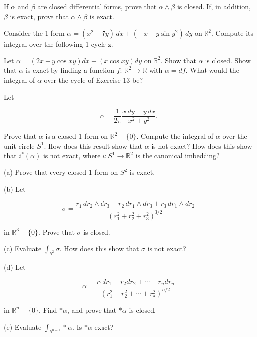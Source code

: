 \begin{problemset}
\item If  $ \alpha $ and  $ \beta $ are closed differential forms, prove that  $ \alpha \wedge \beta $ is closed. If, in addition,  $ \beta $ is exact, prove that  $ \alpha \wedge \beta $ is exact.

\item Consider the 1-form  $ \alpha = (x^2 + 7y)\,dx + (-x + y\sin y^2)\,dy $ on  $ \mathbb{R}^2 $. Compute its integral over the following 1-cycle z.

\begin{center}
\end{center}

\item Let  $ \alpha = (2x + y \cos xy)dx + (x \cos xy)dy $ on  $ \mathbb{R}^2 $. Show that  $ \alpha $ is closed. Show that  $ \alpha $ is exact by finding a function  $ f $:  $ \mathbb{R}^2 \to \mathbb{R} $ with  $ \alpha = df $. What would the integral of  $ \alpha $ over the cycle of Exercise 13 be?

\item Let

\[
\alpha=\frac{1}{2\pi}\frac{x\,dy-y\,dx}{x^{2}+y^{2}}.
\]

Prove that $\alpha$ is a closed 1-form on $\mathbb{R}^2 - \{0\}$. Compute the integral of $\alpha$ over the unit circle $S^1$. How does this result show that $\alpha$ is not exact? How does this show that $i^{*}(\alpha)$ is not exact, where $i: S^1 \to \mathbb{R}^2$ is the canonical imbedding?

\item (a) Prove that every closed 1-form on  $ S^{2} $ is exact.

(b) Let

\[
\sigma=\frac{r_{1}\,d r_{2}\wedge d r_{3}-r_{2}\,d r_{1}\wedge d r_{3}+r_{3}\,d r_{1}\wedge d r_{2}}{(r_{1}^{2}+r_{2}^{2}+r_{3}^{2})^{3/2}}
\]

in  $ \mathbb{R}^{3} - \{0\} $. Prove that  $ \sigma $ is closed.

(c) Evaluate  $ \int_{S^{2}}\sigma $. How does this show that  $ \sigma $ is not exact?

(d) Let

\[
\alpha=\frac{r_{1}d r_{1}+r_{2}d r_{2}+\cdots+r_{n}d r_{n}}{(r_{1}^{2}+r_{2}^{2}+\cdots+r_{n}^{2})^{n/2}}
\]

in  $ \mathbb{R}^n - \{0\} $. Find  $ *\alpha $, and prove that  $ *\alpha $ is closed.

(e) Evaluate  $ \int_{S^{n-1}} \ast \alpha $. Is  $ \ast \alpha $ exact?


\end{problemset}

